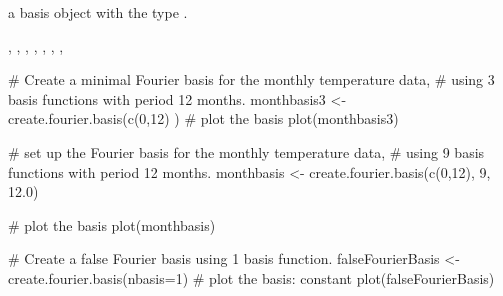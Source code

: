 \documentclass{article}
\begin{document}
\begin{Value}
a basis object with the type .
\end{Value}
\begin{SeeAlso}\relax
{},
,
,
,
,
,
,
\end{SeeAlso}
\begin{Examples}
\begin{ExampleCode}
# Create a minimal Fourier basis for the monthly temperature data,
#  using 3 basis functions with period 12 months.
monthbasis3 <- create.fourier.basis(c(0,12) )
#  plot the basis
plot(monthbasis3)

# set up the Fourier basis for the monthly temperature data,
#  using 9 basis functions with period 12 months.
monthbasis <- create.fourier.basis(c(0,12), 9, 12.0)

#  plot the basis
plot(monthbasis)

# Create a false Fourier basis using 1 basis function.
falseFourierBasis <- create.fourier.basis(nbasis=1)
#  plot the basis:  constant
plot(falseFourierBasis)

\end{ExampleCode}
\end{Examples}
\end{document}
